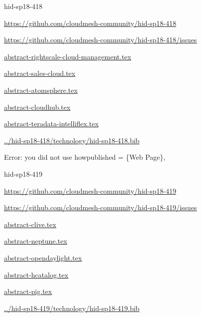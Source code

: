 \begin{IU}

hid-sp18-418

\url{https://github.com/cloudmesh-community/hid-sp18-418}

\url{https://github.com/cloudmesh-community/hid-sp18-418/issues}

\href{https://github.com/cloudmesh-community/hid-sp18-418/blob/master//technology/abstract-rightscale-cloud-management.tex}{abstract-rightscale-cloud-management.tex}

\href{https://github.com/cloudmesh-community/hid-sp18-418/blob/master//technology/abstract-sales-cloud.tex}{abstract-sales-cloud.tex}

\href{https://github.com/cloudmesh-community/hid-sp18-418/blob/master//technology/abstract-atomsphere.tex}{abstract-atomsphere.tex}

\href{https://github.com/cloudmesh-community/hid-sp18-418/blob/master//technology/abstract-cloudhub.tex}{abstract-cloudhub.tex}

\href{https://github.com/cloudmesh-community/hid-sp18-418/blob/master//technology/abstract-teradata-intelliflex.tex}{abstract-teradata-intelliflex.tex}

\href{https://github.com/cloudmesh-community/hid-sp18-418/blob/master//technology/hid-sp18-418.bib}{../hid-sp18-418/technology/hid-sp18-418.bib}

Error: you did not use howpublished = \{Web Page\},

\end{IU}


\begin{IU}

hid-sp18-419

\url{https://github.com/cloudmesh-community/hid-sp18-419}

\url{https://github.com/cloudmesh-community/hid-sp18-419/issues}

\href{https://github.com/cloudmesh-community/hid-sp18-419/blob/master//technology/abstract-clive.tex}{abstract-clive.tex}

\href{https://github.com/cloudmesh-community/hid-sp18-419/blob/master//technology/abstract-neptune.tex}{abstract-neptune.tex}

\href{https://github.com/cloudmesh-community/hid-sp18-419/blob/master//technology/abstract-opendaylight.tex}{abstract-opendaylight.tex}

\href{https://github.com/cloudmesh-community/hid-sp18-419/blob/master//technology/abstract-hcatalog.tex}{abstract-hcatalog.tex}

\href{https://github.com/cloudmesh-community/hid-sp18-419/blob/master//technology/abstract-pig.tex}{abstract-pig.tex}

\href{https://github.com/cloudmesh-community/hid-sp18-419/blob/master//technology/hid-sp18-419.bib}{../hid-sp18-419/technology/hid-sp18-419.bib}

\end{IU}


